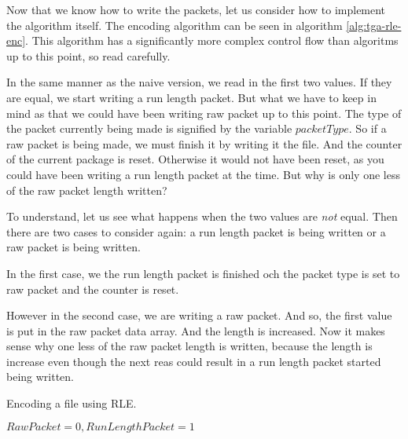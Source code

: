 \begin{refsection}
Now that we know how to write the packets, let us consider how to
implement the algorithm itself. The encoding algorithm can be seen in
algorithm \ref{alg:tga-rle-enc}. This algorithm has a significantly
more complex control flow than algoritms up to this point, so read
carefully.

In the same manner as the naive version, we read in the first two
values. If they are equal, we start writing a run length packet. But
what we have to keep in mind as that we could have been writing raw
packet up to this point. The type of the packet currently being made
is signified by the variable $packetType$. So if a raw packet is being
made, we must finish it by writing it the file. And the counter of the
current package is reset. Otherwise it would not have been reset, as
you could have been writing a run length packet at the time. But why
is only one less of the raw packet length written?

To understand, let us see what happens when the two values are
\textit{not} equal. Then there are two cases to consider again: a run
length packet is being written or a raw packet is being written.

In the first case, we the run length packet is finished och the packet
type is set to raw packet and the counter is reset.

However in the second case, we are writing a raw packet. And so, the
first value is put in the raw packet data array. And the length is
increased. Now it makes sense why one less of the raw packet length is
written, because the length is increase even though the next reas
could result in a run length packet started being written.

\begin{algorithm}[h]
  \caption{Encoding a file using RLE.}
  \label{alg:tga-rle-enc}
  \begin{algorithmic}[1]
    \Require $RawPacket = 0,RunLengthPacket = 1$


    \While{\neof}


            \State {}
          \EndIf



\end{algorithmic}
\end{algorithm}
\end{refsection}
